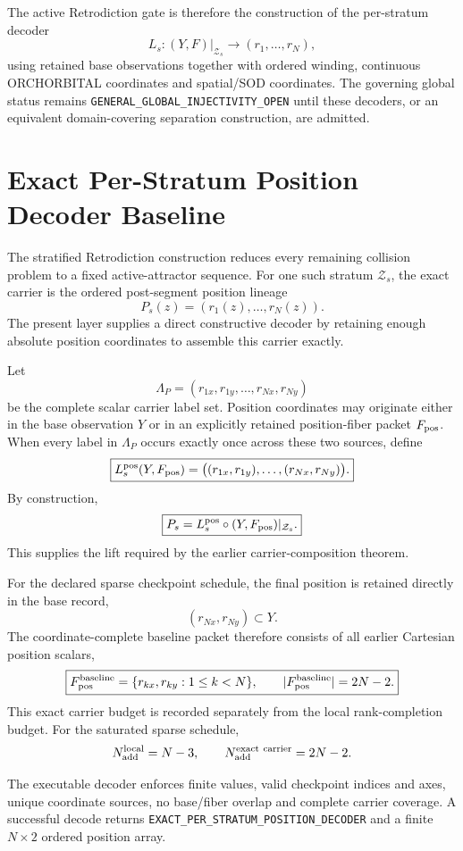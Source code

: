 \documentclass[11pt]{book}
\begin{document}
The active Retrodiction gate is therefore the construction of the per-stratum decoder
\[
\boxed{
L_s:(Y,F)|_{\mathcal Z_s}\longrightarrow(r_1,\ldots,r_N),
}
\]
using retained base observations together with ordered winding, continuous ORCHORBITAL coordinates and spatial/SOD coordinates. The governing global status remains \texttt{GENERAL\_GLOBAL\_INJECTIVITY\_OPEN} until these decoders, or an equivalent domain-covering separation construction, are admitted.

\chapter{Exact Per-Stratum Position Decoder Baseline}
\label{chap:per-stratum-position-decoder}

The stratified Retrodiction construction reduces every remaining collision problem to a fixed active-attractor sequence. For one such stratum $\mathcal Z_s$, the exact carrier is the ordered post-segment position lineage
\[
P_s(z)=(r_1(z),\ldots,r_N(z)).
\]
The present layer supplies a direct constructive decoder by retaining enough absolute position coordinates to assemble this carrier exactly.

Let
\[
\Lambda_P=(r_{1x},r_{1y},\ldots,r_{Nx},r_{Ny})
\]
be the complete scalar carrier label set. Position coordinates may originate either in the base observation $Y$ or in an explicitly retained position-fiber packet $F_{\rm pos}$. When every label in $\Lambda_P$ occurs exactly once across these two sources, define
\[
\boxed{
L_s^{\rm pos}(Y,F_{\rm pos})
=\bigl((r_{1x},r_{1y}),\ldots,(r_{Nx},r_{Ny})\bigr).
}
\]
By construction,
\[
\boxed{
P_s=L_s^{\rm pos}\circ(Y,F_{\rm pos})|_{\mathcal Z_s}.
}
\]
This supplies the lift required by the earlier carrier-composition theorem.

For the declared sparse checkpoint schedule, the final position is retained directly in the base record,
\[
(r_{Nx},r_{Ny})\subset Y.
\]
The coordinate-complete baseline packet therefore consists of all earlier Cartesian position scalars,
\[
\boxed{
F_{\rm pos}^{\rm baseline}=\{r_{kx},r_{ky}:1\le k<N\},
\qquad
|F_{\rm pos}^{\rm baseline}|=2N-2.
}
\]
This exact carrier budget is recorded separately from the local rank-completion budget. For the saturated sparse schedule,
\[
N_{\rm add}^{\rm local}=N-3,
\qquad
N_{\rm add}^{\rm exact\ carrier}=2N-2.
\]

The executable decoder enforces finite values, valid checkpoint indices and axes, unique coordinate sources, no base/fiber overlap and complete carrier coverage. A successful decode returns \texttt{EXACT\_PER\_STRATUM\_POSITION\_DECODER} and a finite $N\times2$ ordered position array.
\end{document}
